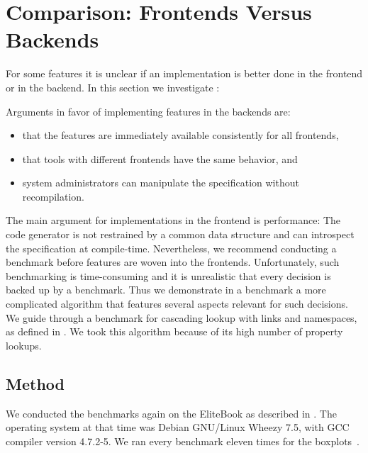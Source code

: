 \section{Comparison: Frontends Versus Backends}
\label{sec:evaluation-comparison}

For some features it is unclear if an implementation is better done in the frontend or in the backend.
In this section we investigate :
\rqComparisonFrontendBackend*

Arguments in favor of implementing features in the backends are:
\begin{itemize}
 \item that the features are immediately available consistently for all frontends,
 \item that tools with different frontends have the same behavior, and
 \item system administrators can manipulate the specification without recompilation.
\end{itemize}
The main argument for implementations in the frontend is performance:
The code generator is not restrained by a common data structure and can introspect the specification at compile-time.
Nevertheless, we recommend conducting a benchmark before features are woven into the frontends.
Unfortunately, such benchmarking is time-consuming and it is unrealistic that every decision is backed up by a benchmark.
Thus we demonstrate in a benchmark a more complicated algorithm that features several aspects relevant for such decisions.
We guide through a benchmark for cascading lookup with links and namespaces, as defined in .
We took this algorithm because of its high number of property lookups.



\subsection{Method}

We conducted the benchmarks again on the EliteBook as described in .
The operating system at that time was Debian GNU/Linux Wheezy 7.5, with GCC compiler version \mbox{4.7.2-5}.
We ran every benchmark eleven times for the boxplots~\cite{raab2015kps}.

